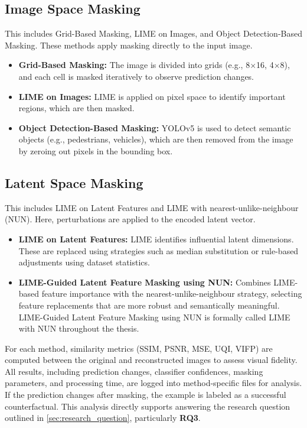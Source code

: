 \subsection*{Image Space Masking}
This includes Grid-Based Masking, LIME on Images, and Object Detection-Based Masking. These methods apply masking directly to the input image.
\begin{itemize}
    \item \textbf{Grid-Based Masking:} The image is divided into grids (e.g., 8$\times$16, 4$\times$8), and each cell is masked iteratively to observe prediction changes.
    \item \textbf{LIME on Images:} LIME is applied on pixel space to identify important regions, which are then masked.
    \item \textbf{Object Detection-Based Masking:} YOLOv5 is used to detect semantic objects (e.g., pedestrians, vehicles), which are then removed from the image by zeroing out pixels in the bounding box.
\end{itemize}

\subsection*{Latent Space Masking}
This includes LIME on Latent Features and LIME with nearest-unlike-neighbour (NUN). Here, perturbations are applied to the encoded latent vector.
\begin{itemize}
    \item \textbf{LIME on Latent Features:} LIME identifies influential latent dimensions. These are replaced using strategies such as median substitution or rule-based adjustments using dataset statistics.
    \item \textbf{LIME-Guided Latent Feature Masking using NUN:} Combines LIME-based feature importance with the nearest-unlike-neighbour strategy, selecting feature replacements that are more robust and semantically meaningful. LIME-Guided Latent Feature Masking using NUN is formally called LIME with NUN throughout the thesis.
\end{itemize}

For each method, similarity metrics (SSIM, PSNR, MSE, UQI, VIFP) are computed between the original and reconstructed images to assess visual fidelity. All results, including prediction changes, classifier confidences, masking parameters, and processing time, are logged into method-specific files for analysis. If the prediction changes after masking, the example is labeled as a successful counterfactual. This analysis directly supports answering the research question outlined in \cref{sec:research_question}, particularly \textbf{RQ3}.


